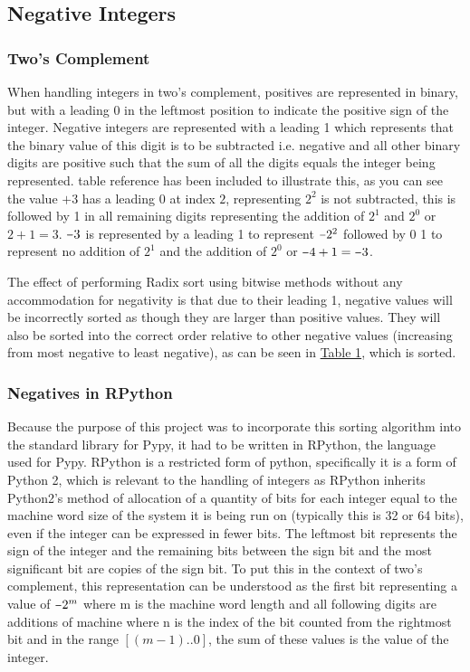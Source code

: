\documentclass[12pt]{article}
\newcommand{\minus}{\scalebox{0.75}[1.0]{$-$}}
\begin{document}
	\subsection{Negative Integers}
	\label{ssec:negativeintegers}
	\subsubsection{Two's Complement}
	\label{ssec:negativestwos}
	When handling integers in two’s complement, positives are represented in binary, but with a leading 0 in the leftmost position to indicate the positive sign of the integer. Negative integers are represented with a leading 1 which represents that the binary value of this digit is to be subtracted i.e. negative and all other binary digits are positive such that the sum of all the digits equals the integer being represented. table reference has been included to illustrate this, as you can see the value $+3$ has a leading $0$ at index $2$, representing $2^{2}$ is not subtracted, this is followed by 1 in all remaining digits representing the addition of $2^{1}$ and $2^{0}$ or $2+1=3$. $\minus3$ is represented by a leading 1 to represent $\minus2^{2}$ followed by 0 1 to represent no addition of $2^{1}$ and the addition of $2^{0}$ or $\minus4 + 1 = \minus3$.
	\par
	The effect of performing Radix sort using bitwise methods without any accommodation for negativity is that due to their leading 1, negative values will be incorrectly sorted as though they are larger than positive values. They will also be sorted into the correct order relative to other negative values (increasing from most negative to least negative), as can be seen in \hyperref[table:twoscomplement]{Table 1}, which is sorted. 	
	\par
	\subsubsection{Negatives in RPython}
  	\label{ssec:pypynegatives}
	Because the purpose of this project was to incorporate this sorting algorithm into the standard library for Pypy, it had to be written in RPython, the language used for Pypy. RPython is a restricted form of python, specifically it is a form of Python 2, which is relevant to the handling of integers as RPython inherits Python2’s method of allocation of a quantity of bits for each integer equal to the machine word size of the system  it is being run on (typically this is 32 or 64 bits), even if the integer can be expressed in fewer bits. The leftmost bit represents the sign of the integer and the remaining bits between the sign bit and the most significant bit are copies of the sign bit. To put this in the context of two’s complement, this representation can be understood as the first bit representing a value of $\minus2^{m}$ where m is the machine word length and all following digits are additions of machine where n is the index of the bit counted from the rightmost bit and in the range $[(m-1)..0]$, the sum of these values is the value of the integer.
	\par
\end{document}
